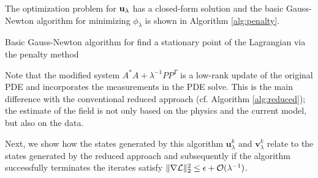 \documentclass{iopart}
\begin{document}
The optimization problem for $\mathbf{u}_{\lambda}$ has a closed-form solution and 
the basic Gauss-Newton algorithm for minimizing $\phi_{\lambda}$ is shown in Algorithm \ref{alg:penalty}.

\begin{algorithm}
\caption{Basic Gauss-Newton algorithm for find a stationary point of the Lagrangian via the penalty method}
\label{alg:penalty}
\begin{algorithmic}
\REPEAT
{}
\end{algorithmic}
\end{algorithm}

Note that the modified system $A^*A + \lambda^{-1}PP^T$ is a low-rank update of the original PDE and
incorporates the measurements in the PDE solve. This is the main difference with the conventional reduced approach (cf. Algorithm \ref{alg:reduced}); 
the estimate of the field is not only based on the physics and the current model, but also on the data.

Next, we show how the states generated by this algorithm $\mathbf{u}^k_{\lambda}$ and $\mathbf{v}^k_{\lambda}$ 
relate to the states generated by the reduced approach and subsequently if the algorithm successfully terminates
the iterates satisfy $\|\nabla\mathcal{L}\|_2^2 \leq \epsilon + \mathcal{O}(\lambda^{-1})$.
\end{document}
